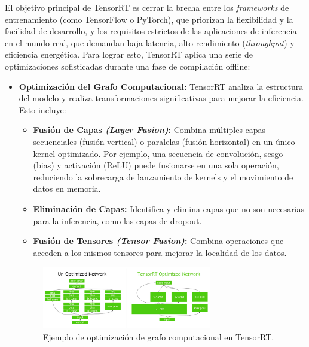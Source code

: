 \documentclass[11pt,spanish,listoffigures,listoftables]{tfgetsinf}
\begin{document}
El objetivo principal de TensorRT es cerrar la brecha entre los \textit{frameworks} de entrenamiento (como TensorFlow o PyTorch), que priorizan la flexibilidad y la facilidad de desarrollo, y los requisitos estrictos de las aplicaciones de inferencia en el mundo real, que demandan baja latencia, alto rendimiento (\textit{throughput}) y eficiencia energética. Para lograr esto, TensorRT aplica una serie de optimizaciones sofisticadas durante una fase de compilación offline:

\begin{itemize}
   \item \textbf{Optimización del Grafo Computacional:} TensorRT analiza la estructura del modelo y realiza transformaciones significativas para mejorar la eficiencia. Esto incluye:
      \begin{itemize}
         \item \textbf{Fusión de Capas \textit{(Layer Fusion)}:} Combina múltiples capas secuenciales (fusión vertical) o paralelas (fusión horizontal) en un único kernel optimizado. Por ejemplo, una secuencia de convolución, sesgo (bias) y activación (ReLU) puede fusionarse en una sola operación, reduciendo la sobrecarga de lanzamiento de kernels y el movimiento de datos en memoria.
         \item \textbf{Eliminación de Capas:} Identifica y elimina capas que no son necesarias para la inferencia, como las capas de dropout.
         \item \textbf{Fusión de Tensores \textit{(Tensor Fusion)}:} Combina operaciones que acceden a los mismos tensores para mejorar la localidad de los datos.
      \end{itemize}

      \begin{figure}[H]
         \centering
         \includegraphics[width=0.7\textwidth]{images/estado_del_arte/TensorRT_optimizaciones.png}
         \caption[Ejemplo de optimización de grafo computacional en TensorRT]{Ejemplo de optimización de grafo computacional en TensorRT.}
         \label{fig:tensorrt_optimization_graph}
      \end{figure}



\end{itemize}
\end{document}
